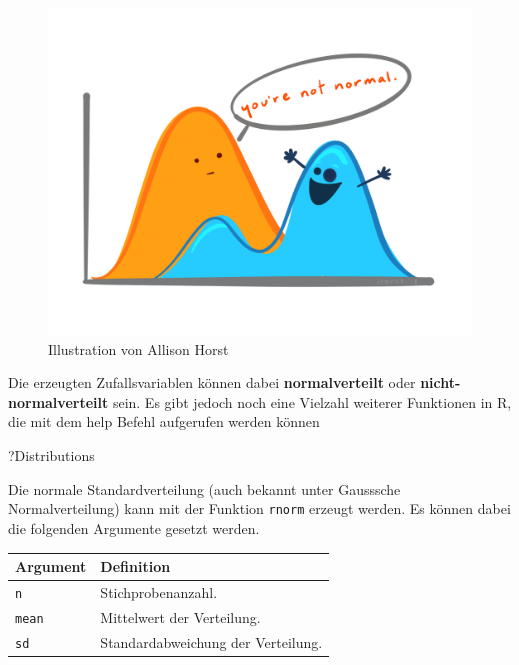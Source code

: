 \documentclass[
]{article}
\newenvironment{Shaded}{\begin{snugshade}}{\end{snugshade}}
\newcommand{\NormalTok}[1]{#1}
\begin{document}
\begin{figure}

{\centering \includegraphics[width=1\linewidth]{images/017} 

}

\caption{Illustration von Allison Horst}\label{fig:unnamed-chunk-76}
\end{figure}

Die erzeugten Zufallsvariablen können dabei \textbf{normalverteilt} oder \textbf{nicht-normalverteilt} sein. Es gibt jedoch noch eine Vielzahl weiterer Funktionen in R, die mit dem help Befehl aufgerufen werden können

\begin{Shaded}
\begin{Highlighting}[]
\NormalTok{?Distributions}
\end{Highlighting}
\end{Shaded}

Die normale Standardverteilung (auch bekannt unter Gausssche Normalverteilung) kann mit der Funktion \texttt{rnorm} erzeugt werden. Es können dabei die folgenden Argumente gesetzt werden.

\begin{longtable}[]{@{}ll@{}}
\toprule
Argument & Definition \\
\midrule
\endhead
\texttt{n} & Stichprobenanzahl. \\
\texttt{mean} & Mittelwert der Verteilung. \\
\texttt{sd} & Standardabweichung der Verteilung. \\
\bottomrule
\end{longtable}
\end{document}
